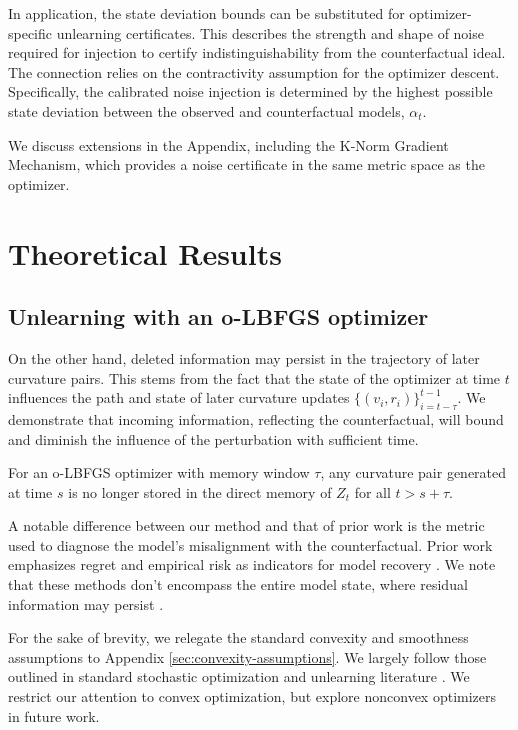 \documentclass{ssl}
\begin{document}
In application, the state deviation bounds can be substituted for optimizer-specific unlearning certificates. This describes the strength and shape of noise required for injection to certify indistinguishability from the counterfactual ideal. The connection relies on the contractivity assumption for the optimizer descent. Specifically, the calibrated noise injection is determined by the highest possible state deviation between the observed and counterfactual models, $\alpha_t.$

We discuss extensions in the Appendix, including the K-Norm Gradient Mechanism, which provides a noise certificate in the same metric space as the optimizer.

\section{Theoretical Results}
\subsection{Unlearning with an o-LBFGS optimizer}
On the other hand, deleted information may persist in the trajectory of later curvature pairs. This stems from the fact that the state of the optimizer at time $t$ influences the path and state of later curvature updates $\{ (v_i, r_i) \}_{i=t-\tau}^{t-1}$. We demonstrate that incoming information, reflecting the counterfactual, will bound and diminish the influence of the perturbation with sufficient time.

\begin{proposition}
For an o-LBFGS optimizer with memory window $\tau$, any curvature pair generated at time $s$ is no longer stored in the direct memory of $Z_t$ for all $t>s+\tau$.
\end{proposition}

A notable difference between our method and that of prior work is the metric used to diagnose the model's misalignment with the counterfactual. Prior work emphasizes regret and empirical risk as indicators for model recovery \cite{qiao_hessian-free_2025, sekhari_remember_2021}. We note that these methods don't encompass the entire model state, where residual information may persist \cite{chen_when_2021, bertran_reconstruction_2024, cooper_machine_2025, stewart_shape_2026}.

For the sake of brevity, we relegate the standard convexity and smoothness assumptions to Appendix \ref{sec:convexity-assumptions}. We largely follow those outlined in standard stochastic optimization and unlearning literature \cite{qiao_hessian-free_2025, byrd_limited_1995}. We restrict our attention to convex optimization, but explore nonconvex optimizers in future work.
\end{document}
